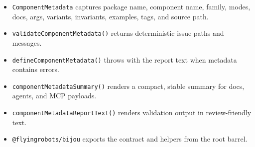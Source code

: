 \begin{itemize}
\tightlist
\item
  \texttt{C\allowbreak{}o\allowbreak{}m\allowbreak{}p\allowbreak{}o\allowbreak{}n\allowbreak{}e\allowbreak{}n\allowbreak{}t\allowbreak{}M\allowbreak{}e\allowbreak{}t\allowbreak{}a\allowbreak{}d\allowbreak{}a\allowbreak{}t\allowbreak{}a} captures package name, component name, family, modes, docs, args, variants, invariants, examples, tags, and source path.
\item
  \texttt{v\allowbreak{}a\allowbreak{}l\allowbreak{}i\allowbreak{}d\allowbreak{}a\allowbreak{}t\allowbreak{}e\allowbreak{}C\allowbreak{}o\allowbreak{}m\allowbreak{}p\allowbreak{}o\allowbreak{}n\allowbreak{}e\allowbreak{}n\allowbreak{}t\allowbreak{}M\allowbreak{}e\allowbreak{}t\allowbreak{}a\allowbreak{}d\allowbreak{}a\allowbreak{}t\allowbreak{}a\allowbreak{}(\allowbreak{})} returns deterministic issue paths and messages.
\item
  \texttt{d\allowbreak{}e\allowbreak{}f\allowbreak{}i\allowbreak{}n\allowbreak{}e\allowbreak{}C\allowbreak{}o\allowbreak{}m\allowbreak{}p\allowbreak{}o\allowbreak{}n\allowbreak{}e\allowbreak{}n\allowbreak{}t\allowbreak{}M\allowbreak{}e\allowbreak{}t\allowbreak{}a\allowbreak{}d\allowbreak{}a\allowbreak{}t\allowbreak{}a\allowbreak{}(\allowbreak{})} throws with the report text when metadata contains errors.
\item
  \texttt{c\allowbreak{}o\allowbreak{}m\allowbreak{}p\allowbreak{}o\allowbreak{}n\allowbreak{}e\allowbreak{}n\allowbreak{}t\allowbreak{}M\allowbreak{}e\allowbreak{}t\allowbreak{}a\allowbreak{}d\allowbreak{}a\allowbreak{}t\allowbreak{}a\allowbreak{}S\allowbreak{}u\allowbreak{}m\allowbreak{}m\allowbreak{}a\allowbreak{}r\allowbreak{}y\allowbreak{}(\allowbreak{})} renders a compact, stable summary for docs, agents, and MCP payloads.
\item
  \texttt{c\allowbreak{}o\allowbreak{}m\allowbreak{}p\allowbreak{}o\allowbreak{}n\allowbreak{}e\allowbreak{}n\allowbreak{}t\allowbreak{}M\allowbreak{}e\allowbreak{}t\allowbreak{}a\allowbreak{}d\allowbreak{}a\allowbreak{}t\allowbreak{}a\allowbreak{}R\allowbreak{}e\allowbreak{}p\allowbreak{}o\allowbreak{}r\allowbreak{}t\allowbreak{}T\allowbreak{}e\allowbreak{}x\allowbreak{}t\allowbreak{}(\allowbreak{})} renders validation output in review-friendly text.
\item
  \texttt{@\allowbreak{}f\allowbreak{}l\allowbreak{}y\allowbreak{}i\allowbreak{}n\allowbreak{}g\allowbreak{}r\allowbreak{}o\allowbreak{}b\allowbreak{}o\allowbreak{}t\allowbreak{}s\allowbreak{}/\allowbreak{}b\allowbreak{}i\allowbreak{}j\allowbreak{}o\allowbreak{}u} exports the contract and helpers from the root barrel.
\end{itemize}

